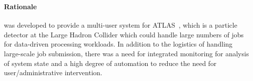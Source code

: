 \documentclass{sig-alternate}
\begin{document}


\subsubsection{\panda}

\paragraph{Rationale}
\panda was developed to provide a multi-user
\pilotjob system for ATLAS~\cite{aad2008atlas}, which is
a particle detector at the Large Hadron Collider
which could
handle large numbers
of jobs for data-driven processing workloads.
In addition to the logistics of handling large-scale job submission, there was
a need for integrated monitoring for analysis of system state and a high
degree of automation to reduce the need for user/administrative intervention.
\end{document}
